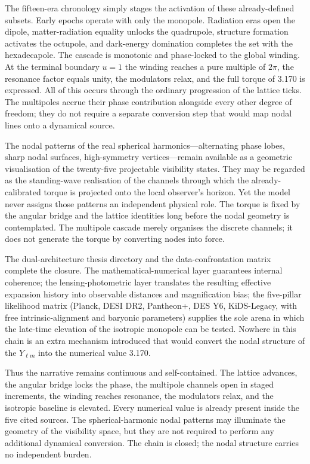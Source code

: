 The fifteen-era chronology simply stages the activation of these already-defined subsets. Early epochs operate with only the monopole. Radiation eras open the dipole, matter-radiation equality unlocks the quadrupole, structure formation activates the octupole, and dark-energy domination completes the set with the hexadecapole. The cascade is monotonic and phase-locked to the global winding. At the terminal boundary \(u=1\) the winding reaches a pure multiple of \(2\pi\), the resonance factor equals unity, the modulators relax, and the full torque of 3.170 is expressed. All of this occurs through the ordinary progression of the lattice ticks. The multipoles accrue their phase contribution alongside every other degree of freedom; they do not require a separate conversion step that would map nodal lines onto a dynamical source.

The nodal patterns of the real spherical harmonics—alternating phase lobes, sharp nodal surfaces, high-symmetry vertices—remain available as a geometric visualisation of the twenty-five projectable visibility states. They may be regarded as the standing-wave realisation of the channels through which the already-calibrated torque is projected onto the local observer’s horizon. Yet the model never assigns those patterns an independent physical role. The torque is fixed by the angular bridge and the lattice identities long before the nodal geometry is contemplated. The multipole cascade merely organises the discrete channels; it does not generate the torque by converting nodes into force.

The dual-architecture thesis directory and the data-confrontation matrix complete the closure. The mathematical-numerical layer guarantees internal coherence; the lensing-photometric layer translates the resulting effective expansion history into observable distances and magnification bias; the five-pillar likelihood matrix (Planck, DESI DR2, Pantheon+, DES Y6, KiDS-Legacy, with free intrinsic-alignment and baryonic parameters) supplies the sole arena in which the late-time elevation of the isotropic monopole can be tested. Nowhere in this chain is an extra mechanism introduced that would convert the nodal structure of the \(Y_{\ell m}\) into the numerical value 3.170.

Thus the narrative remains continuous and self-contained. The lattice advances, the angular bridge locks the phase, the multipole channels open in staged increments, the winding reaches resonance, the modulators relax, and the isotropic baseline is elevated. Every numerical value is already present inside the five cited sources. The spherical-harmonic nodal patterns may illuminate the geometry of the visibility space, but they are not required to perform any additional dynamical conversion. The chain is closed; the nodal structure carries no independent burden.

